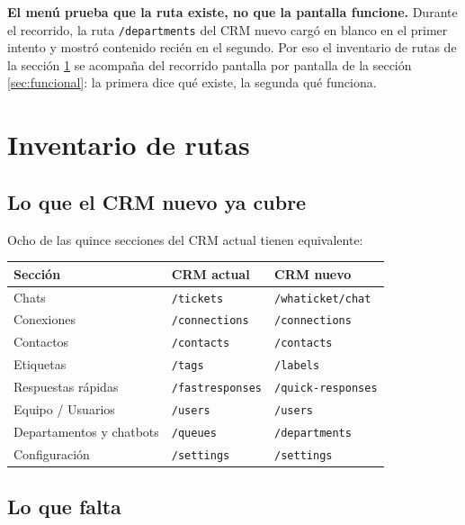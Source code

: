 \documentclass[11pt,a4paper]{article}
\newcommand{\cod}[1]{\texttt{\small #1}}
\begin{document}
\begin{nota}
\textbf{El menú prueba que la ruta existe, no que la pantalla funcione.} Durante el
recorrido, la ruta \cod{/departments} del CRM nuevo cargó en blanco en el primer
intento y mostró contenido recién en el segundo. Por eso el inventario de rutas de la
sección \ref{sec:rutas} se acompaña del recorrido pantalla por pantalla de la sección
\ref{sec:funcional}: la primera dice qué existe, la segunda qué funciona.
\end{nota}

\section{Inventario de rutas}
\label{sec:rutas}

\subsection{Lo que el CRM nuevo ya cubre}

Ocho de las quince secciones del CRM actual tienen equivalente:

\begin{center}
\begin{tabular}{@{}lll@{}}
\toprule
\textbf{Sección} & \textbf{CRM actual} & \textbf{CRM nuevo} \\
\midrule
Chats                    & \cod{/tickets}        & \cod{/whaticket/chat} \\
Conexiones               & \cod{/connections}    & \cod{/connections} \\
Contactos                & \cod{/contacts}       & \cod{/contacts} \\
Etiquetas                & \cod{/tags}           & \cod{/labels} \\
Respuestas rápidas       & \cod{/fastresponses}  & \cod{/quick-responses} \\
Equipo / Usuarios        & \cod{/users}          & \cod{/users} \\
Departamentos y chatbots & \cod{/queues}         & \cod{/departments} \\
Configuración            & \cod{/settings}       & \cod{/settings} \\
\bottomrule
\end{tabular}
\end{center}

\subsection{Lo que falta}
\end{document}
